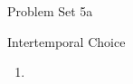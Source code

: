 \documentclass{handout}
\begin{document}
\thispagestyle{empty}

\centerline{\Large Problem Set 5a}
\centerline{\large Intertemporal Choice}

\begin{enumerate} 


\item 



\end{enumerate}


\end{document}
